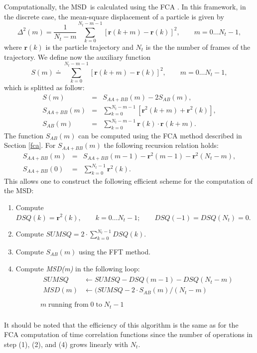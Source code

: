 \documentclass[a4paper,11pt]{article}
\begin{document}
Computationally, the \gls{MSD}\ is calculated using the \gls{FCA} \cite{Kneller:KFA}. In this
framework, in the discrete case, the mean-square displacement of a particle is given by
\begin{equation}
\label{eq:msd_discrete}
\Delta^2(m) = \frac{1}{N_t - m}\sum\limits_{k=0}^{N_t-m-1}
[\textbf{r}(k+m) - \textbf{r}(k)]^2, \qquad m = 0\ldots N_t-1,
\end{equation}
where $\textbf{r}(k)$ is the particle trajectory and $N_t$ is the the number of frames of the trajectory. We define now the
auxiliary function
\begin{equation}
S(m) \doteq \sum\limits_{k=0}^{N_t-m-1}[\textbf{r}(k+m) - \textbf{r}(k)]^2,
\qquad m = 0\ldots N_t-1,
\end{equation}
which is splitted as follow:
\begin{eqnarray}
S(m)          &= &S_{AA+BB}(m) - 2 S_{AB}(m),\\
S_{AA+BB}(m)  &= &\sum\limits_{k=0}^{N_t-m-1}[\textbf{r}^2(k+m) + \textbf{r}^2(k)], \\
S_{AB}(m)     &= &\sum\limits_{k=0}^{N_t-m-1} \textbf{r}(k)\cdot\textbf{r}(k+m).
\end{eqnarray}
The function $S_{AB}(m)$ can be computed using the \gls{FCA} method described
in Section \ref{fca}. For $S_{AA+BB}(m)$ the following recursion
relation holds:
\begin{eqnarray}
S_{AA+BB}(m) &= &S_{AA+BB}(m-1) - \textbf{r}^2(m-1)  - \textbf{r}^2(N_t - m),\\
S_{AA+BB}(0) &= &\sum\limits_{k=0}^{N_t-1} \textbf{r}^2(k).
\end{eqnarray}
This allows one to construct the following efficient scheme for the
computation of the \gls{MSD}:
\begin{enumerate}
\item Compute $DSQ(k) = \textbf{r}^2(k),\qquad k = 0\ldots N_t-1;\qquad
      DSQ(-1) = DSQ(N_t) = 0$.
\item Compute $SUMSQ = 2\cdot\sum\limits_{k=0}^{N_t-1} DSQ(k)$.
\item Compute $S_{AB}(m)$ using the \gls{FFT} method.
\item Compute \textit{MSD(m)} in the following loop:
      \begin{displaymath}
      \begin{array}{ll}
                &\begin{array}{ll}
                 SUMSQ  &\leftarrow SUMSQ - DSQ(m-1) - DSQ(N_t - m)\\
                 MSD(m) &\leftarrow (SUMSQ - 2\cdot S_{AB}(m)/(N_t-m)\\
                \end{array}\\
                 &m\; \mbox{running from}\; 0 \;\mbox{to}\; N_t - 1\\
      \end{array}
      \end{displaymath}
\end{enumerate}
It should be noted that the efficiency of this algorithm is the same
as for the \gls{FCA} computation of time correlation functions since the
number of operations in step (1), (2), and (4) grows linearly with
$N_t$.
\end{document}

